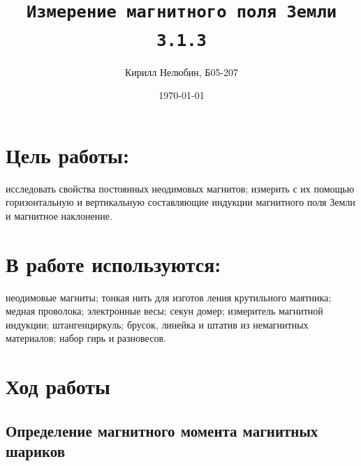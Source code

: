 \documentclass[12pt,a4paper]{article}
\title{\texttt{Измерение магнитного поля Земли \\ 3.1.3}}
\author{Кирилл Нелюбин, Б05-207}
\date{\today}
\begin{document}
\maketitle

\section{Цель работы:}
исследовать свойства постоянных неодимовых магнитов;
измерить с их помощью горизонтальную и вертикальную составляющие
индукции магнитного поля Земли и магнитное наклонение.
\section{В работе используются:}  
неодимовые магниты; тонкая нить для изготов­
ления крутильного маятника; медная проволока; электронные весы; секун­
домер; измеритель магнитной индукции; штангенциркуль; брусок, линейка
и штатив из немагнитных материалов; набор гирь и разновесов.


\section{Ход работы}
\subsection{Определение магнитного момента магнитных шариков}
\end{document}

